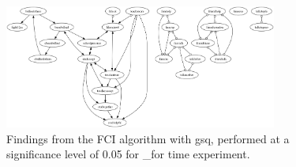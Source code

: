 \begin{figure}[htbp]
    \centering
    \includegraphics[width=0.8\textwidth]{Report/final_report/pictures/FCI_gsq_0.05__for time experiment.png}
    \caption{Findings from the FCI algorithm with gsq, performed at a significance level of 0.05 for _for time experiment.}
    \label{fig:fci_gsq_0.05_for time experiment}
\end{figure}
